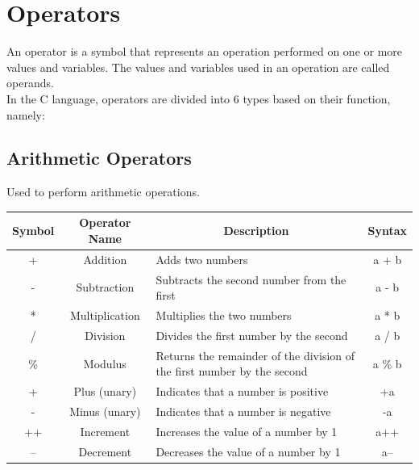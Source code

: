 \section{Operators}

An operator is a symbol that represents an operation performed on one or more values and variables.  
The values and variables used in an operation are called operands.  
\\ In the C language, operators are divided into 6 types based on their function, namely:

\subsection{Arithmetic Operators}

Used to perform arithmetic operations.
\begin{center}
    \begin{tabular}{|c|c|p{8cm}|c|}
        \hline
        \multicolumn{1}{|c|}{\textbf{Symbol}} &
        \multicolumn{1}{c|}{\textbf{Operator Name}} &
        \multicolumn{1}{c|}{\textbf{Description}} &
        \multicolumn{1}{c|}{\textbf{Syntax}} \\ \hline
        +   & Addition          & Adds two numbers & a + b \\ \hline
        -   & Subtraction       & Subtracts the second number from the first & a - b \\ \hline
        *   & Multiplication    & Multiplies the two numbers & a * b \\ \hline
        /   & Division          & Divides the first number by the second & a / b \\ \hline
        \%  & Modulus           & Returns the remainder of the division of the first number by the second & a \% b \\ \hline
        +   & Plus (unary)      & Indicates that a number is positive & +a \\ \hline
        -   & Minus (unary)     & Indicates that a number is negative & -a \\ \hline
        ++  & Increment         & Increases the value of a number by 1 & a++ \\ \hline
        --  & Decrement         & Decreases the value of a number by 1 & a-- \\ \hline
    \end{tabular}
\end{center}

